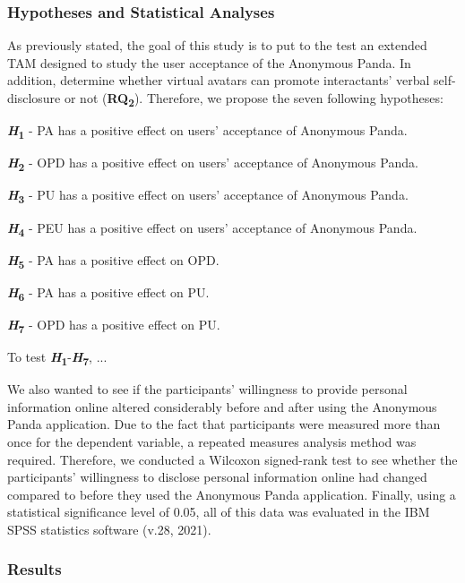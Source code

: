 \subsubsection{Hypotheses and Statistical Analyses}
As previously stated, the goal of this study is to put to the test an extended TAM designed to study the user acceptance of the Anonymous Panda. In addition, determine whether virtual avatars can promote interactants' verbal self-disclosure or not (\textbf{RQ\textsubscript{2}}). Therefore, we propose the seven following hypotheses:

\textbf{\textit{H}\textsubscript{1}} - PA has a positive effect on users' acceptance of Anonymous Panda.

\textbf{\textit{H}\textsubscript{2}} - OPD has a positive effect on users' acceptance of Anonymous Panda.

\textbf{\textit{H}\textsubscript{3}} - PU has a positive effect on users' acceptance of Anonymous Panda.

\textbf{\textit{H}\textsubscript{4}} - PEU has a positive effect on users' acceptance of Anonymous Panda.

\textbf{\textit{H}\textsubscript{5}} - PA has a positive effect on OPD.

\textbf{\textit{H}\textsubscript{6}} - PA has a positive effect on PU.

\textbf{\textit{H}\textsubscript{7}} - OPD has a positive effect on PU.

To test \textbf{\textit{H}\textsubscript{1}}-\textbf{\textit{H}\textsubscript{7}}, ...

We also wanted to see if the participants' willingness to provide personal information online altered considerably before and after using the Anonymous Panda application. Due to the fact that participants were measured more than once for the dependent variable, a repeated measures analysis method was required. Therefore, we conducted a Wilcoxon signed-rank test to see whether the participants' willingness to disclose personal information online had changed compared to before they used the Anonymous Panda application. Finally, using a statistical significance level of 0.05, all of this data was evaluated in the IBM SPSS statistics software (v.28, 2021).

\subsubsection{Results}


